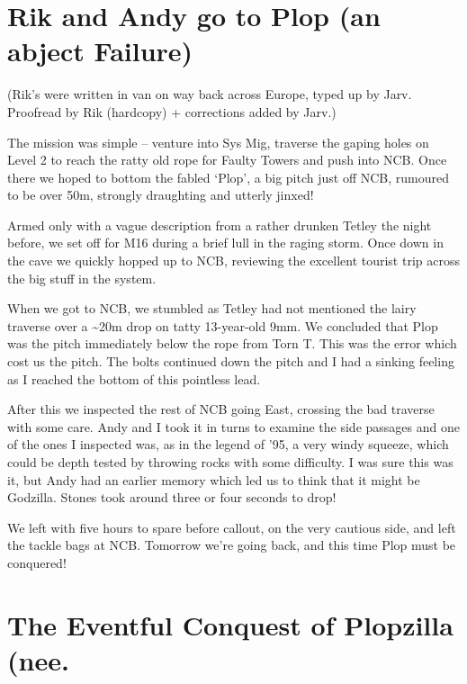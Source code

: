 
\section{Rik and Andy go to Plop (an abject
Failure)}\label{rik-and-andy-go-to-plop-an-abject-failure}

(Rik's were written in van on way back across Europe, typed up by Jarv.
Proofread by Rik (hardcopy) + corrections added by Jarv.)

The mission was simple -- venture into Sys Mig, traverse the gaping
holes on Level 2 to reach the ratty old rope for Faulty Towers and push
into NCB. Once there we hoped to bottom the fabled `Plop', a big pitch
just off NCB, rumoured to be over 50m, strongly draughting and utterly
jinxed!

Armed only with a vague description from a rather drunken Tetley the
night before, we set off for M16 during a brief lull in the raging
storm. Once down in the cave we quickly hopped up to NCB, reviewing the
excellent tourist trip across the big stuff in the system.

When we got to NCB, we stumbled as Tetley had not mentioned the lairy
traverse over a \textasciitilde{}20m drop on tatty 13-year-old 9mm. We
concluded that Plop was the pitch immediately below the rope from Torn
T. This was the error which cost us the pitch. The bolts continued down
the pitch and I had a sinking feeling as I reached the bottom of this
pointless lead.

After this we inspected the rest of NCB going East, crossing the bad
traverse with some care. Andy and I took it in turns to examine the side
passages and one of the ones I inspected was, as in the legend of '95, a
very windy squeeze, which could be depth tested by throwing rocks with
some difficulty. I was sure this was it, but Andy had an earlier memory
which led us to think that it might be Godzilla. Stones took around
three or four seconds to drop!

We left with five hours to spare before callout, on the very cautious
side, and left the tackle bags at NCB. Tomorrow we're going back, and
this time Plop must be conquered!


\section{The Eventful Conquest of Plopzilla
(nee.}\label{the-eventful-conquest-of-plopzilla-nee.}

